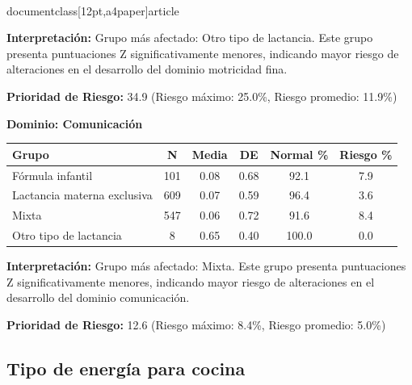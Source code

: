 \\documentclass[12pt,a4paper]{article}
\begin{document}
\textbf{Interpretación:} Grupo más afectado: Otro tipo de lactancia. Este grupo presenta puntuaciones Z significativamente menores, indicando mayor riesgo de alteraciones en el desarrollo del dominio motricidad fina.

\textbf{Prioridad de Riesgo:} 34.9 (Riesgo máximo: 25.0\%, Riesgo promedio: 11.9\%)


\vspace{0.5cm}


\textbf{Dominio: Comunicación}


\begin{center}
\begin{tabular}{|l|c|c|c|c|c|}
\hline
\textbf{Grupo} & \textbf{N} & \textbf{Media} & \textbf{DE} & \textbf{Normal \%} & \textbf{Riesgo \%} \\
\hline
Fórmula infantil & 101 & 0.08 & 0.68 & 92.1 & 7.9 \\
Lactancia materna exclusiva & 609 & 0.07 & 0.59 & 96.4 & 3.6 \\
Mixta & 547 & 0.06 & 0.72 & 91.6 & 8.4 \\
Otro tipo de lactancia & 8 & 0.65 & 0.40 & 100.0 & 0.0 \\

\hline
\end{tabular}
\end{center}


\textbf{Interpretación:} Grupo más afectado: Mixta. Este grupo presenta puntuaciones Z significativamente menores, indicando mayor riesgo de alteraciones en el desarrollo del dominio comunicación.

\textbf{Prioridad de Riesgo:} 12.6 (Riesgo máximo: 8.4\%, Riesgo promedio: 5.0\%)


\vspace{0.5cm}


\subsection{Tipo de energía para cocina}
\end{document}
